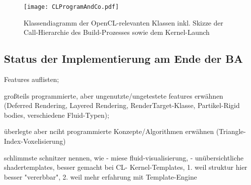 		\begin{figure}[!h]
		\texttt{[image: CLProgramAndCo.pdf]}
		\caption{Klassendiagramm der OpenCL-relevanten Klassen inkl. Skizze der Call-Hierarchie des Build-Prozesses
		sowie dem Kernel-Launch}
		\label{fig:OCLRelatedClassDiag}
		\end{figure}




\subsection{Status der Implementierung am Ende der BA}
\label{sec:statusImplementation}
	
	Features auflisten;

	großteils programmierte, aber ungenutzte/ungetestete features erwähnen (Deferred Rendering, Layered Rendering, 	
	RenderTarget-Klasse, Partikel-Rigid bodies, verschiedene Fluid-Typen); 


	überlegte aber nciht programmierte Konzepte/Algorithmen erwähnen (Triangle-Index-Voxelisierung)
	
	schlimmste schnitzer nennen, wie
		- miese fluid-visualisierung, 
		- unübersichtliche shadertemplates, besser gemacht bei CL-
			Kernel-Templates, 1. weil struktur hier besser "vererbbar", 2. weil mehr erfahrung mit  Template-Engine
	
	  	
  	

\clearpage
